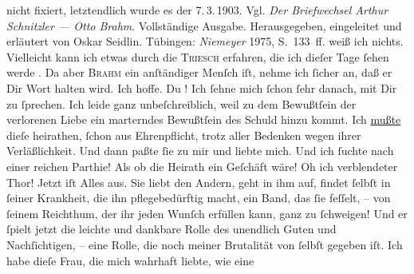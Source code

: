 \begin{ledgroupsized}[t]{13cm}
{{{                  nicht fixiert, letztendlich wurde es der 7. 3. 1903. Vgl. \emph{Der
                        Briefwechsel Arthur Schnitzler — Otto Brahm}. Vollständige Ausgabe.
                     Herausgegeben, eingeleitet und erläutert von Oskar Seidlin.
                     Tübingen: \emph{Niemeyer}{ }1975, S. 133 ff.}}}\label{K_L03362-1h} weiß ich nichts. Vielleicht kann ich etwas durch die \textsc{Triesch} erfahren, die ich dieſer Tage ſehen werde . Da aber \textsc{Brahm} ein anſtändiger Menſch iſt,  nehme ich ſicher an, daß er Dir Wort halten wird.\pend
           \pstart
           Ich hoffe. Du \label{K_L03362-2v}\label{K_L03362-2h}! Ich ſehne mich ſchon ſehr danach, mit Dir zu ſprechen. Ich leide {\pb}ganz unbeſchreiblich, weil zu dem Bewußtſein der
               verlorenen Liebe ein marterndes Bewußtſein des Schuld hinzu kommt. Ich \uline{mußte} dieſe \label{K_L03362-3v}\label{K_L03362-3h} heirathen, ſchon aus Ehrenpflicht, trotz aller Bedenken wegen ihrer
               Verläßlichkeit. Und dann paßte ſie zu mir und liebte mich. Und ich ſuchte nach einer
               reichen Parthie! Als ob die Heirath ein Geſchäft wäre! Oh ich verblendeter Thor!
               Jetzt iſt {\pb}Alles aus. Sie liebt den Andern, geht in ihm auf, findet ſelbſt in
               ſeiner Krankheit, die ihn pflegebedürftig macht, ein \strikeout{\textcolor{gray}{×}\-\textcolor{gray}{×}} Band, das ſie feſſelt, – von ſeinem Reichthum, der ihr jeden Wunſch erfüllen
               kann, ganz zu ſchweigen! Und er ſpielt  jetzt die
               leichte und dankbare Rolle des unendlich Guten und Nachſichtigen, – eine Rolle, die
               noch meiner Brutalität von ſelbſt gegeben iſt. Ich habe dieſe Frau, die mich wahrhaft liebte, wie eine

\end{ledgroupsized}
